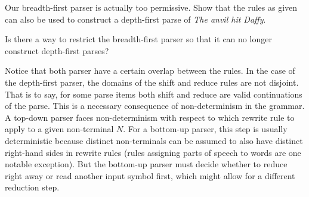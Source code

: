\begin{exercise}
    Our breadth-first parser is actually too permissive.
    Show that the rules as given can also be used to construct a depth-first parse of \emph{The anvil hit Daffy}.
\end{exercise}
%
\begin{exercise}
    Is there a way to restrict the breadth-first parser so that it can no longer construct depth-first parses?
\end{exercise}

Notice that both parser have a certain overlap between the rules.
In the case of the depth-first parser, the domains of the shift and reduce rules are not disjoint.
That is to say, for some parse items both shift and reduce are valid continuations of the parse.
This is a necessary consequence of non-determinism in the grammar.
A top-down parser faces non-determinism with respect to which rewrite rule to apply to a given non-terminal $N$.
For a bottom-up parser, this step is usually deterministic because distinct non-terminals can be assumed to also have distinct right-hand sides in rewrite rules (rules assigning parts of speech to words are one notable exception).
But the bottom-up parser must decide whether to reduce right away or read another input symbol first, which might allow for a different reduction step.
%
